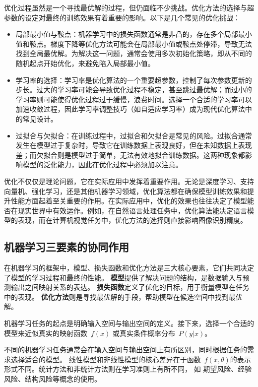 优化过程虽然是一个寻找最优解的过程，但仍面临不少挑战。优化方法的选择与超参数的设定对最终的训练效果有着重要的影响。以下是几个常见的优化挑战：
 \begin{itemize} 
\item 局部最小值与鞍点：机器学习中的损失函数通常是非凸的，存在多个局部最小值和鞍点。梯度下降等优化方法可能会在局部最小值或鞍点处停滞，导致无法找到全局最优解。为解决这一问题，通常会使用多次初始化策略，即从不同的随机起点开始优化，来避免陷入局部最小值。
\item 学习率的选择：学习率是优化算法的一个重要超参数，控制了每次参数更新的步长。过大的学习率可能会导致优化过程不稳定，甚至跳过最优解；而过小的学习率则可能使得优化过程过于缓慢，浪费时间。选择一个合适的学习率可以加速收敛过程，因此学习率调整技巧（如自适应学习率）成为现代优化算法中的常见设计。
\item  过拟合与欠拟合：在训练过程中，过拟合和欠拟合是常见的风险。过拟合通常发生在模型过于复杂时，导致它在训练数据上表现良好，但在未知数据上表现差；而欠拟合则是模型过于简单，无法有效地拟合训练数据。这两种现象都影响模型的泛化能力，因此在优化过程中必须加以注意。
  \end{itemize}

优化不仅仅是理论问题，它在实际应用中发挥着重要作用。无论是深度学习、支持向量机、强化学习，还是其他机器学习领域，优化算法都在确保模型训练效果和提升性能方面起着至关重要的作用。在实际应用中，优化的效果也往往决定了模型能否在现实世界中有效运作。例如，在自然语言处理任务中，优化算法能决定语言模型的表现，而在计算机视觉任务中，优化方法的选择则直接影响图像识别精度。

 \subsection{机器学习三要素的协同作用}
在机器学习的框架中，模型、损失函数和优化方法是三大核心要素，它们共同决定了模型的学习过程和最终的性能。
{\bf 模型}提供了解决问题的结构，是数据输入与预测输出之间映射关系的表达。
{\bf 损失函数}定义了优化的目标，用于衡量模型在任务中的表现。
{\bf 优化方法}则是寻找最优解的手段，帮助模型在候选空间中找到最优解。

机器学习任务的起点是明确输入空间与输出空间的定义。接下来，选择一个合适的模型来近似真实的映射函数~$f(x)$ 或真实条件概率分布~$P(y|x)$。

不同的机器学习任务通常会在输入空间与输出空间上有所区别，同时根据任务的需求选择适合的模型。
线性模型和非线性模型的核心差异在于函数~$ f(x, \theta)$的表示形式不同。统计方法和非统计方法则在学习准则上有所不同， 如	期望风险、经验风险、结构风险等概念的使用。

